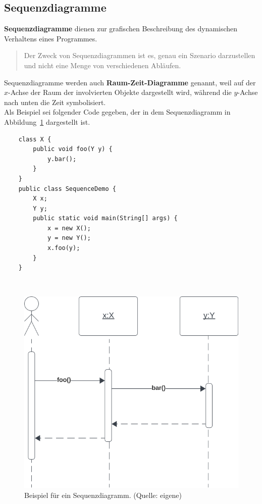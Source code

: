 \newpage
\subsection{Sequenzdiagramme}

\textbf{Sequenzdiagramme} dienen zur grafischen Beschreibung des dynamischen Verhaltens eines Programmes.

\begin{tcolorbox}[enlarge top by=0.5cm,enlarge bottom by=0.5cm]
\blockquote[{\cite[333]{Oes05}}]{
Der Zweck von Sequenzdiagrammen ist es, genau ein Szenario darzustellen und nicht eine Menge von verschiedenen Abläufen.
}
\end{tcolorbox}

\noindent
Sequenzdiagramme werden auch \textbf{Raum-Zeit-Diagramme} genannt, weil auf der $x$-Achse der Raum der involvierten
Objekte dargestellt wird, während die $y$-Achse nach unten die Zeit symbolisiert.\\

\noindent
Als Beispiel sei folgender Code gegeben, der in dem Sequenzdiagramm in Abbildung~\ref{fig:sequence} dargestellt ist.

\begin{verbatim}
    class X {
        public void foo(Y y) {
            y.bar();
        }
    }
    public class SequenceDemo {
        X x;
        Y y;
        public static void main(String[] args) {
            x = new X();
            y = new Y();
            x.foo(y);
        }
    }
\end{verbatim}\\


\begin{figure}
    \centering
    \includegraphics[scale=0.5]{chapters/fopt3/img/sequence}
    \caption{Beispiel für ein Sequenzdiagramm. (Quelle: eigene)}
    \label{fig:sequence}
\end{figure}

